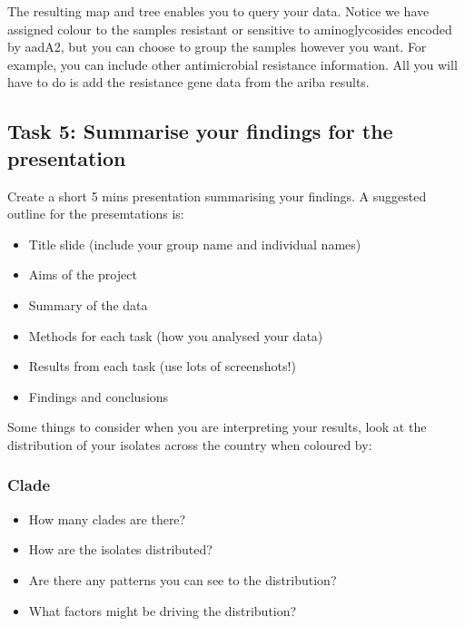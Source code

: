 \documentclass[11pt]{article}
\providecommand{\tightlist}{%
      \setlength{\itemsep}{0pt}\setlength{\parskip}{0pt}}
\begin{document}
The resulting map and tree enables you to query your data. Notice we
have assigned colour to the samples resistant or sensitive to
aminoglycosides encoded by aadA2, but you can choose to group the
samples however you want. For example, you can include other
antimicrobial resistance information. All you will have to do is add the
resistance gene data from the ariba results.

    \hypertarget{task-5-summarise-your-findings-for-the-presentation}{%
\subsection{Task 5: Summarise your findings for the
presentation}\label{task-5-summarise-your-findings-for-the-presentation}}

Create a short 5 mins presentation summarising your findings. A
suggested outline for the presemtations is:

\begin{itemize}
\tightlist
\item
  Title slide (include your group name and individual names)
\item
  Aims of the project
\item
  Summary of the data
\item
  Methods for each task (how you analysed your data)
\item
  Results from each task (use lots of screenshots!)
\item
  Findings and conclusions
\end{itemize}

Some things to consider when you are interpreting your results, look at
the distribution of your isolates across the country when coloured by:

\hypertarget{clade}{%
\subsubsection{Clade}\label{clade}}

\begin{itemize}
\tightlist
\item
  How many clades are there?
\item
  How are the isolates distributed?
\item
  Are there any patterns you can see to the distribution?
\item
  What factors might be driving the distribution?
\end{itemize}
\end{document}
